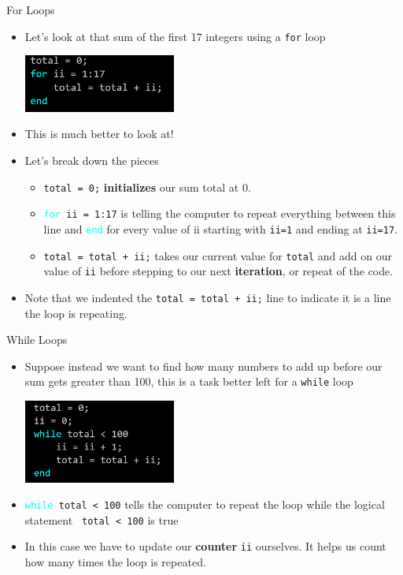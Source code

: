{}\documentclass[letterpaper,
compress,
xcolor=x11names,
]{beamer}
\begin{document}
\begin{frame}{For Loops}
	\footnotesize
	\begin{itemize}
		\item Let's look at that sum of the first 17 integers using a \texttt{for} loop
		\begin{center}
			\includegraphics[width = 5cm]{for_example.png}
		\end{center}
		\item This is much better to look at!
		\item Let's break down the pieces
		\begin{itemize}
			\item \texttt{total = 0;} \textbf{initializes} our sum total at 0.
			\item \texttt{\textcolor{cyan}{for} ii = 1:17} is telling the computer to repeat everything between this line and \texttt{\textcolor{cyan}{end}} for every value of ii starting with \texttt{ii=1} and ending at \texttt{ii=17}. 
			\item \texttt{total = total + ii;} takes our current value for \texttt{total} and add on our value of \texttt{ii} before stepping to our next \textbf{iteration}, or repeat of the code. 
		\end{itemize}
		\item Note that we indented the \texttt{total = total + ii;} line to indicate it is a line the loop is repeating.
	\end{itemize}
\end{frame}


\begin{frame}{While Loops}
	\footnotesize
	\begin{itemize}
		\item Suppose instead we want to find how many numbers to add up before our sum gets greater than 100, this is a task better left for a \texttt{while} loop
		\begin{center}
			\includegraphics[width = 5cm]{while_example.png}
		\end{center}
		\item \texttt{\textcolor{cyan}{while} total < 100} tells the computer to repeat the loop while the logical statement \texttt{ total < 100} is true
		\item In this case we have to update our \textbf{counter} \texttt{ii} ourselves. It helps us count how many times the loop is repeated.
	\end{itemize}
\end{frame}
\end{document}

